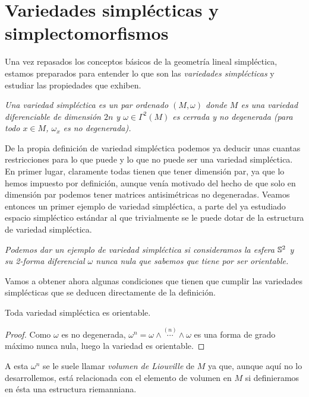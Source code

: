 \section{Variedades simplécticas y simplectomorfismos}\label{sec:variedades}
Una vez repasados los conceptos básicos de la geometría lineal simpléctica, estamos preparados para entender lo que son las \emph{variedades simplécticas} y estudiar las propiedades que exhiben.
\begin{defn}
  \em
  Una \emph{variedad simpléctica} es un par ordenado $(M,\omega)$ donde $M$ es una variedad diferenciable de dimensión $2n$ y $\omega \in \Gamma^2(M)$ es cerrada y no degenerada (para todo $x \in M$, $\omega_x$ es no degenerada). 
\end{defn}

De la propia definición de variedad simpléctica podemos ya deducir unas cuantas restricciones para lo que puede y lo que no puede ser una variedad simpléctica. En primer lugar, claramente todas tienen que tener dimensión par, ya que lo hemos impuesto por definición, aunque venía motivado del hecho de que solo en dimensión par podemos tener matrices antisimétricas no degeneradas. Veamos entonces un primer ejemplo de variedad simpléctica, a parte del ya estudiado espacio simpléctico estándar al que trivialmente se le puede dotar de la estructura de variedad simpléctica.

\begin{ejemplo}
  \em
  Podemos dar un ejemplo de variedad simpléctica si consideramos la esfera $\mathbb{S}^2$ y su 2-forma diferencial $\omega$ nunca nula que sabemos que tiene por ser orientable. 
\end{ejemplo}

Vamos a obtener ahora algunas condiciones que tienen que cumplir las variedades simplécticas que se deducen directamente de la definición.

\begin{prop}
  Toda variedad simpléctica es orientable.
\end{prop}
\begin{proof}
  Como $\omega$ es no degenerada, $\omega^n=\omega \wedge \overset{(n)}{\cdots} \wedge \omega$ es una forma de grado máximo nunca nula, luego la variedad es orientable.
\end{proof}

A esta $\omega^n$ se le suele llamar \emph{volumen de Liouville} de $M$ ya que, aunque aquí no lo desarrollemos, está relacionada con el elemento de volumen en $M$ si definieramos en ésta una estructura riemanniana.

